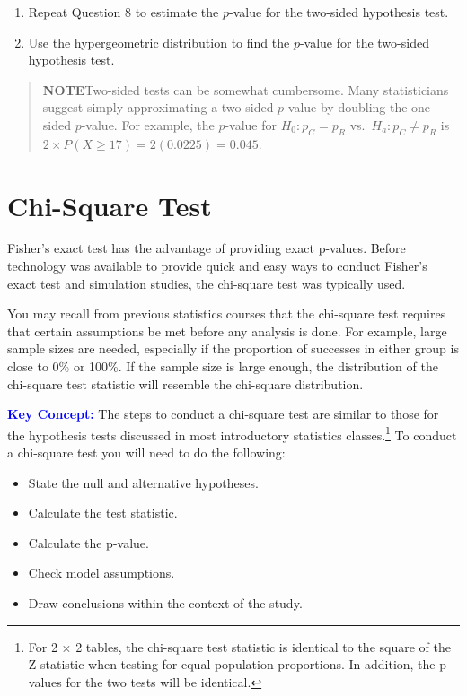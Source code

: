 \documentclass[
]{book}
\begin{document}
\begin{enumerate}
\def\labelenumi{\arabic{enumi}.}
\setcounter{enumi}{14}
\item
  Repeat Question 8 to estimate the \(p\)-value for the two-sided hypothesis test.
\item
  Use the hypergeometric distribution to find the \(p\)-value for the two-sided hypothesis test.
\end{enumerate}

\begin{quote}
\textbf{NOTE}Two-sided tests can be somewhat cumbersome. Many statisticians suggest simply approximating a two-sided \(p\)-value by doubling the one-sided \(p\)-value. For example, the \(p\)-value for \(H_0: p_C = p_R\) vs.~\(H_a: p_C \neq p_R\) is \(2 \times P(X \ge 17) = 2(0.0225) = 0.045\).
\end{quote}

\hypertarget{chi-square-test}{%
\section{Chi-Square Test}\label{chi-square-test}}

Fisher's exact test has the advantage of providing exact p-values. Before technology was available to provide quick and easy ways to conduct Fisher's exact test and simulation studies, the chi-square test was typically used.

You may recall from previous statistics courses that the chi-square test requires that certain assumptions be met before any analysis is done. For example, large sample sizes are needed, especially if the proportion of successes in either group is close to 0\% or 100\%. If the sample size is large enough, the distribution of the chi-square test statistic will resemble the chi-square distribution.

\textbf{\textcolor{blue}{Key Concept:}}
The steps to conduct a chi-square test are similar to those for the hypothesis tests discussed in most introductory statistics classes.\footnote{For 2 × 2 tables, the chi-square test statistic is identical to the square of the Z-statistic when testing for equal population proportions. In addition, the p-values for the two tests will be identical.} To conduct a chi-square test you will need to do the following:

\begin{itemize}
\item
  State the null and alternative hypotheses.
\item
  Calculate the test statistic.
\item
  Calculate the p-value.
\item
  Check model assumptions.
\item
  Draw conclusions within the context of the study.
\end{itemize}
\end{document}
